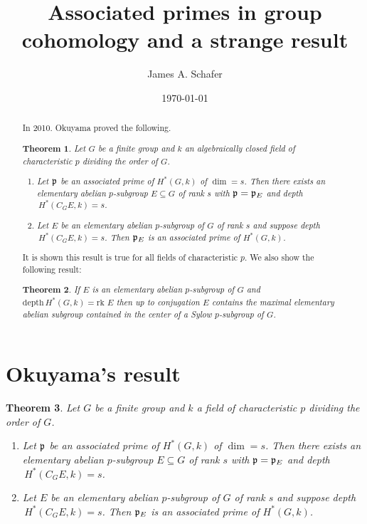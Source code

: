 \documentclass[reqno]{amsart}
\title{Associated primes in group cohomology and a strange result}
\author{James A. Schafer}
\date{\today}
\theoremstyle{plain}%
\newtheorem*{thm*}{Theorem}
\theoremstyle{definition}
\theoremstyle{remark}
\newcommand\sub{\subseteq}
\newcommand\dph{\text{depth}\,}
\newcommand\rk{\text{rk }}
\begin{document}
\maketitle

\begin{abstract} In 2010.  Okuyama \cite{O} proved the following.
 
\begin{thm*} Let $G$ be a finite group and $k$ an algebraically closed field of characteristic $p$ dividing the order of $G$. 
\begin{enumerate}\item Let $\frak p$ be an associated prime of $H^*(G,k)$ of $\dim=s$.  Then there exists an elementary abelian $p$-subgroup $E\sub G$ of rank $s$ with $\frak p=\frak p_E$ and depth$\,H^*(C_GE,k)=s$.
\item Let $E$ be an elementary abelian $p$-subgroup of $G$ of rank $s$ and suppose depth$\,H^*(C_GE,k)=s$.  Then $\frak p_E$ is an associated prime of $H^*(G,k)$.
\end{enumerate}\end{thm*}
 
It is shown this result is true for all fields of characteristic $p$. We also show the following result: 
\begin{thm*} If $E$ is an elementary abelian $p$-subgroup of $G$ and $\dph H^*(G,k)=\rk E$ then up to conjugation $E$ contains the maximal elementary abelian subgroup contained in the center of a Sylow $p$-subgroup of $G$. \end{thm*}

\end{abstract}

\section{Okuyama's result}
\begin{thm*} Let $G$ be a finite group and $k$ a field of characteristic $p$ dividing the order of $G$. 
\begin{enumerate}\item Let $\frak p$ be an associated prime of $H^*(G,k)$ of $\dim=s$.  Then there exists an elementary abelian $p$-subgroup $E\sub G$ of rank $s$ with $\frak p=\frak p_E$ and depth$\,H^*(C_GE,k)=s$.
\item Let $E$ be an elementary abelian $p$-subgroup of $G$ of rank $s$ and suppose depth$\,H^*(C_GE,k)=s$.  Then $\frak p_E$ is an associated prime of $H^*(G,k)$.
\end{enumerate}\end{thm*}
  
\end{document}
